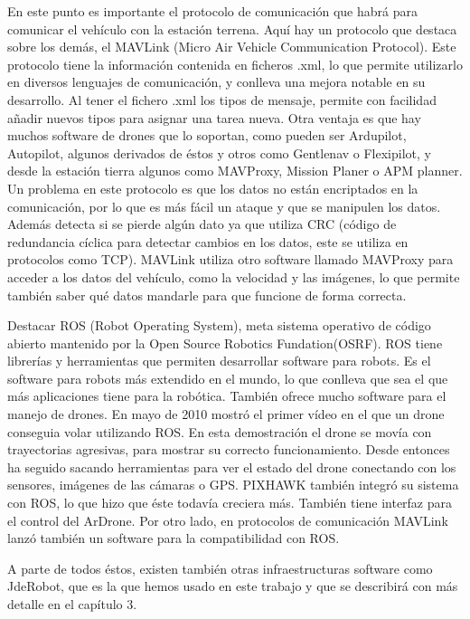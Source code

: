 \hspace{1 cm} En este punto es importante el protocolo de comunicaci\'on que habr\'a para comunicar el veh\'iculo con la estaci\'on terrena. Aqu\'i hay un protocolo que destaca sobre los dem\'as, el MAVLink (Micro Air Vehicle Communication Protocol). Este protocolo tiene la informaci\'on contenida en ficheros .xml, lo que permite utilizarlo en diversos lenguajes de comunicaci\'on, y conlleva una mejora notable en su desarrollo. Al tener el fichero .xml los tipos de mensaje, permite con facilidad añadir nuevos tipos para asignar una tarea nueva. Otra ventaja es que hay muchos software de drones que lo soportan, como pueden ser Ardupilot, Autopilot, algunos derivados de \'estos y otros como Gentlenav o Flexipilot, y desde la estaci\'on tierra algunos como MAVProxy, Mission Planer o APM planner. 
Un problema en este protocolo es que los datos no est\'an encriptados en la comunicaci\'on, por lo que es m\'as f\'acil un ataque y que se manipulen los datos. Adem\'as detecta si se pierde alg\'un dato ya que utiliza CRC (c\'odigo de redundancia c\'iclica para detectar cambios en los datos, este se utiliza en protocolos como TCP).
MAVLink utiliza otro software llamado MAVProxy para acceder a los datos del veh\'iculo, como la velocidad y las im\'agenes, lo que permite tambi\'en saber qu\'e datos mandarle para que funcione de forma correcta. 

\hspace{1 cm} Destacar ROS (Robot Operating System), meta sistema operativo de c\'odigo abierto mantenido por la Open Source Robotics Fundation(OSRF). ROS tiene librer\'ias y herramientas que permiten desarrollar software para robots. Es el software para robots m\'as extendido en el mundo, lo que conlleva que sea el que m\'as aplicaciones tiene para la rob\'otica. Tambi\'en ofrece mucho software para el manejo de drones. En mayo de 2010 mostr\'o el primer v\'ideo en el que un drone conseguia volar utilizando ROS. En esta demostraci\'on el drone se mov\'ia con trayectorias agresivas, para mostrar su correcto funcionamiento. Desde entonces ha seguido sacando herramientas para ver el estado del drone conectando con los sensores, im\'agenes de las c\'amaras o GPS. PIXHAWK tambi\'en integr\'o su sistema con ROS, lo que hizo que \'este todav\'ia creciera m\'as. Tambi\'en tiene interfaz para el control del ArDrone. Por otro lado, en protocolos de comunicaci\'on MAVLink lanz\'o tambi\'en un software para la compatibilidad con ROS. 


\hspace{1 cm} A parte de todos \'estos, existen tambi\'en otras infraestructuras software como JdeRobot, que es la que hemos usado en este trabajo y que se describir\'a con m\'as detalle en el cap\'itulo 3. 



